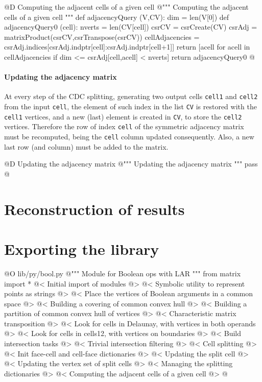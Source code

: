 \documentclass[11pt,oneside]{article}	%
\begin{document}
@D Computing the adjacent cells of a given cell
@{""" Computing the adjacent cells of a given cell """
def adjacencyQuery (V,CV):
	dim = len(V[0])
	def adjacencyQuery0 (cell):
		nverts = len(CV[cell])
		csrCV =  csrCreate(CV)
		csrAdj = matrixProduct(csrCV,csrTranspose(csrCV))
		cellAdjacencies = csrAdj.indices[csrAdj.indptr[cell]:csrAdj.indptr[cell+1]]
		return [acell for acell in cellAdjacencies if dim <= csrAdj[cell,acell] < nverts]
	return adjacencyQuery0
@}

\paragraph{Updating the adjacency matrix}
At every step of the CDC splitting, generating two output cells \texttt{cell1} and  \texttt{cell2} from the input  \texttt{cell}, the element of such index in the list \texttt{CV} is restored with the \texttt{cell1} vertices, and a new (last) element is created in \texttt{CV}, to store the \texttt{cell2} vertices.
Therefore the row of index \texttt{cell} of the symmetric  adjacency matrix must be recomputed, being the \texttt{cell} column updated consequently. Also, a new last row (and column) must be added to the matrix. 

@D Updating the adjacency matrix
@{""" Updating the adjacency matrix """
pass
@}


\section{Reconstruction of results}

\section{Exporting the library}


@O lib/py/bool.py
@{""" Module for Boolean ops with LAR """
from matrix import *
@< Initial import of modules @>
@< Symbolic utility to represent points as strings @>
@< Place the vertices of Boolean arguments in a common space @>
@< Building a covering of common convex hull @>
@< Building a partition of common convex hull of vertices @>
@< Characteristic matrix transposition @>
@< Look for cells in Delaunay, with vertices in both operands @>
@< Look for cells in cells12, with vertices on boundaries @>
@< Build intersection tasks @>
@< Trivial intersection filtering @>
@< Cell splitting @>
@< Init face-cell and cell-face dictionaries @>
@< Updating the split cell @>
@< Updating the vertex set  of split cells @>
@< Managing the splitting dictionaries @>
@< Computing the adjacent cells of a given cell @>
@}
\end{document}
